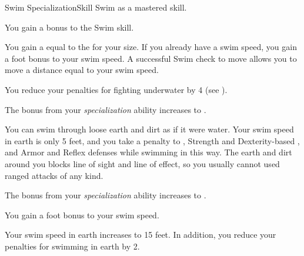     \begin{feat}{Swim Specialization}{Skill}
        \featpre Swim as a mastered skill.

         You gain a  bonus to the Swim skill.

         You gain a  equal to the  for your size.
        If you already have a swim speed, you gain a  foot bonus to your swim speed.
        A successful Swim check to move allows you to move a distance equal to your swim speed.

         You reduce your penalties for fighting underwater by 4 (see ).

         The bonus from your \textit{specialization} ability increases to .

         You can swim through loose earth and dirt as if it were water.
        Your swim speed in earth is only 5 feet, and you take a  penalty to , Strength and Dexterity-based , and Armor and Reflex defenses while swimming in this way.
        The earth and dirt around you blocks line of sight and line of effect, so you usually cannot used ranged attacks of any kind.

         The bonus from your \textit{specialization} ability increases to .

         You gain a  foot bonus to your swim speed.

         Your swim speed in earth increases to 15 feet.
        In addition, you reduce your penalties for swimming in earth by 2.
    \end{feat}

